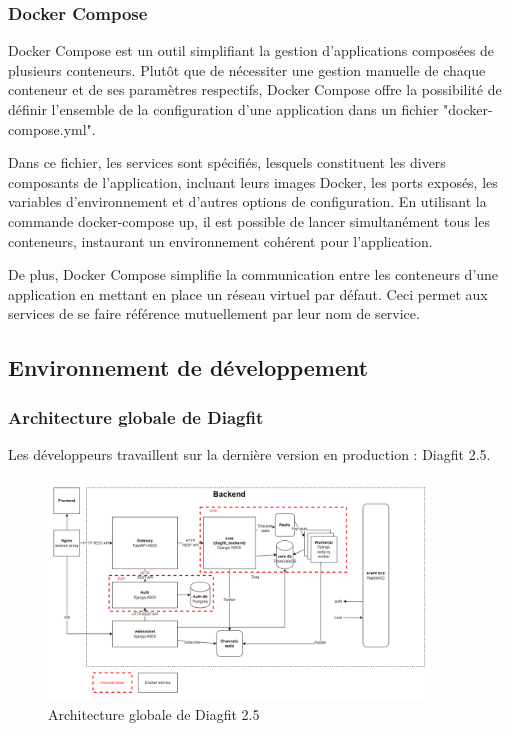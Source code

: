 \subsubsection{Docker Compose}
Docker Compose est un outil simplifiant la gestion d'applications composées de plusieurs conteneurs.
Plutôt que de nécessiter une gestion manuelle de chaque conteneur et de ses paramètres respectifs, Docker Compose offre la possibilité de définir l'ensemble de la configuration d'une application dans un fichier "docker-compose.yml".

Dans ce fichier, les services sont spécifiés, lesquels constituent les divers composants de l'application, incluant leurs images Docker, les ports exposés, les variables d'environnement et d'autres options de configuration.
En utilisant la commande docker-compose up, il est possible de lancer simultanément tous les conteneurs, instaurant un environnement cohérent pour l'application.

De plus, Docker Compose simplifie la communication entre les conteneurs d'une application en mettant en place un réseau virtuel par défaut.
Ceci permet aux services de se faire référence mutuellement par leur nom de service.

\subsection{Environnement de développement}
\subsubsection{Architecture globale de Diagfit}
Les développeurs travaillent sur la dernière version en production : Diagfit 2.5.

\begin{figure}[ht!]
    \centering
    \includegraphics[width=0.9\textwidth]{paper/figures/archi2-5.png}
    \caption{Architecture globale de Diagfit 2.5}
    \label{fig:archi2-5}
\end{figure}

